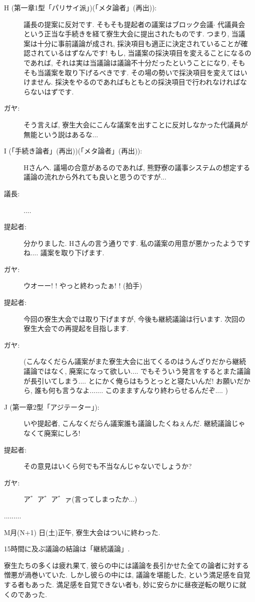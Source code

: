 \documentclass[10pt,b5jsbook,dvips,dvipdfmx,openany]{jsbook}
\theoremstyle{definition}
\begin{document}
\begin{multicols}{2}
\begin{description}
		\item[H (第一章1型「パリサイ派」)(「メタ論者」(再出)): ]議長の提案に反対です. そもそも提起者の議案はブロック会議$ \cdot $ 代議員会という正当な手続きを経て寮生大会に提出されたものです. つまり, 当議案は十分に事前議論が成され, 採決項目も適正に決定されていることが確認されているはずなんです! もし, 当議案の採決項目を変えることになるのであれば, それは実は当議論は議論不十分だったということになり, そもそも当議案を取り下げるべきです. その場の勢いで採決項目を変えてはいけません. 採決をやるのであればもともとの採決項目で行われなければならないはずです. 

		\item[ガヤ: ]そう言えば, 寮生大会にこんな議案を出すことに反対しなかった代議員が無能という説はあるな...

		\item[I (「手続き論者」(再出))(「メタ論者」(再出)): ] Hさんへ. 議場の合意があるのであれば, 熊野寮の議事システムの想定する議論の流れから外れても良いと思うのですが...

		\item[議長: ].... 

		\item[提起者: ]分かりました. Hさんの言う通りです. 私の議案の用意が悪かったようですね.... 議案を取り下げます. 

		\item[ガヤ: ]ウオーー! ! やっと終わったぁ! ! (拍手)

		\item[提起者: ]今回の寮生大会では取り下げますが, 今後も継続議論は行います. 次回の寮生大会での再提起を目指します. 

		\item[ガヤ: ](こんなくだらん議案がまた寮生大会に出てくるのはうんざりだから継続議論ではなく, 廃案になって欲しい.... でもそういう発言をするとまた議論が長引いてしまう.... とにかく俺らはもうとっとと寝たいんだ! お願いだから, 誰も何も言うなよ....... このまますんなり終わらせるんだぞ.... )

		\item[J (第一章2型「アジテーター」): ]いや提起者, こんなくだらん議案誰も議論したくねぇんだ. 継続議論じゃなくて廃案にしろ! 

		\item[提起者: ]その意見はいくら何でも不当なんじゃないでしょうか?

		\item[ガヤ: ]ア゛ア゛ア゛ァ(言ってしまったか...)

		\end{description}
		.........

		M月(N+1) 日(土)正午, 寮生大会はついに終わった. 

		15時間に及ぶ議論の結論は「継続議論」. 

		寮生たちの多くは疲れ果て, 彼らの中には議論を長引かせた全ての論者に対する憎悪が渦巻いていた. しかし彼らの中には, 議論を堪能した, という満足感を自覚する者もあった. 満足感を自覚できない者も, 妙に安らかに昼夜逆転の眠りに就くのであった. 

		\end{multicols}
		\normalsize
\end{document}
